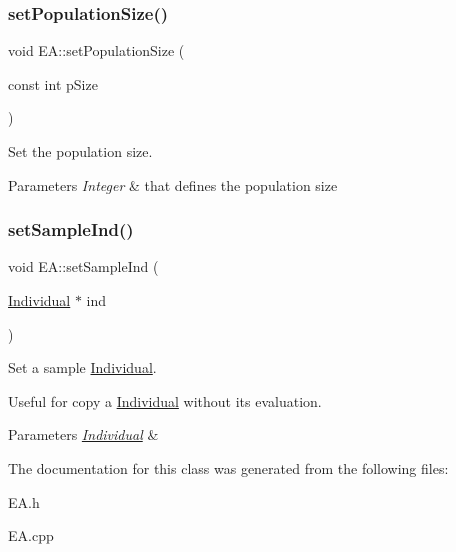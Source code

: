 \subsubsection{\texorpdfstring{set\+Population\+Size()}{setPopulationSize()}}
{\footnotesize\ttfamily void E\+A\+::set\+Population\+Size (\begin{DoxyParamCaption}\item[{const int}]{p\+Size }\end{DoxyParamCaption})\hspace{0.3cm}{\ttfamily [inline]}}



Set the population size. 


\begin{DoxyParams}{Parameters}
{\em Integer} & that defines the population size \\
\hline
\end{DoxyParams}
\mbox{\label{classEA_add9a924cd307b2a49b1cf961c65e8ef2}} 
\subsubsection{\texorpdfstring{set\+Sample\+Ind()}{setSampleInd()}}
{\footnotesize\ttfamily void E\+A\+::set\+Sample\+Ind (\begin{DoxyParamCaption}\item[{\mbox{\hyperlink{classIndividual}{Individual}} $\ast$}]{ind }\end{DoxyParamCaption})\hspace{0.3cm}{\ttfamily [inline]}}



Set a sample \mbox{\hyperlink{classIndividual}{Individual}}. 

Useful for copy a \mbox{\hyperlink{classIndividual}{Individual}} without its evaluation. 
\begin{DoxyParams}{Parameters}
{\em \mbox{\hyperlink{classIndividual}{Individual}}} & \\
\hline
\end{DoxyParams}


The documentation for this class was generated from the following files\+:\begin{DoxyCompactItemize}
\item 
E\+A.\+h\item 
E\+A.\+cpp\end{DoxyCompactItemize}
